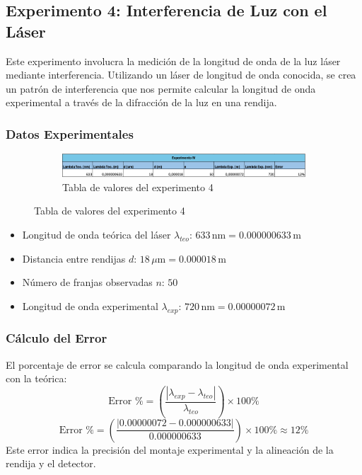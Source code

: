\subsection{Experimento 4: Interferencia de Luz con el Láser}

Este experimento involucra la medición de la longitud de onda de la luz láser mediante interferencia. Utilizando un láser de longitud de onda conocida, se crea un patrón de interferencia que nos permite calcular la longitud de onda experimental a través de la difracción de la luz en una rendija.

\subsubsection{Datos Experimentales}

\begin{figure}[H]
  \centering
  \begin{subfigure}[b]{\textwidth}
      \centering
      \includegraphics[width=\textwidth]{Figures/1. Content/tabla-experimento-4.png}
      \caption{Tabla de valores del experimento 4}
      \label{fig: Tabla experimento 4}
  \end{subfigure}
  \hfill
\end{figure}

\begin{itemize}
    \item Longitud de onda teórica del láser \(\lambda_{teo}\): \(633 \, \text{nm} = 0.000000633 \, \text{m}\)
    \item Distancia entre rendijas \(d\): \(18 \, \mu\text{m} = 0.000018 \, \text{m}\)
    \item Número de franjas observadas \(n\): \(50\)
    \item Longitud de onda experimental \(\lambda_{exp}\): \(720 \, \text{nm} = 0.00000072 \, \text{m}\)
\end{itemize}

\subsubsection{Cálculo del Error}
El porcentaje de error se calcula comparando la longitud de onda experimental con la teórica:
\[
\text{Error \%} = \left(\frac{\left| \lambda_{exp} - \lambda_{teo} \right|}{\lambda_{teo}}\right) \times 100\%
\]
\[
\text{Error \%} = \left(\frac{\left| 0.00000072 - 0.000000633 \right|}{0.000000633}\right) \times 100\% \approx 12\%
\]
Este error indica la precisión del montaje experimental y la alineación de la rendija y el detector.

